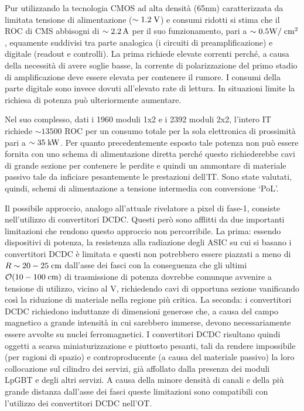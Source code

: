 
Pur utilizzando la tecnologia CMOS ad alta densit\`a (65nm) caratterizzata da limitata tensione di alimentazione ($\sim 1.2\rm \; V$) e consumi ridotti si stima che il ROC di CMS abbisogni di $\sim 2.2\rm \, A$ per il suo funzionamento, pari a $\sim 0.5{\mathrm W}/\rm \; cm^2$, equamente suddivisi tra parte analogica (i circuiti di preamplificazione) e digitale (readout e controlli). La prima richiede elevate correnti perch\'e, a causa della necessit\`a di avere soglie basse, la corrente di polarizzazione del primo stadio di amplificazione deve essere elevata per contenere il rumore. I consumi della parte digitale sono invece dovuti all'elevato rate di lettura. In situazioni limite la richiesa di potenza pu\`o ulteriormente aumentare.

Nel suo complesso, dati i 1960 moduli 1x2 e i 2392 moduli 2x2, l'intero IT richiede $\sim13500$ ROC per un consumo totale per la sola elettronica di prossimit\`a pari a $\sim 35\rm \; kW$. Per quanto precedentemente esposto tale potenza non pu\`o essere fornita con uno schema di alimentazione diretta perch\'e questo richiederebbe cavi di grande sezione per contenere le perdite e quindi un ammontare di materiale passivo tale da inficiare pesantemente le prestazioni dell'IT. Sono state valutati, quindi, schemi di alimentazione a tensione intermedia con conversione `PoL'.

Il possibile approccio, analogo all'attuale rivelatore a pixel di fase-1, consiste nell'utilizzo di convertitori DCDC. Questi per\`o sono afflitti da due importanti limitazioni che rendono questo approccio non percorribile. La prima: essendo dispositivi di potenza, la resistenza alla radiazione degli ASIC su cui si basano i convertitori DCDC \`e limitata e questi non potrebbero essere piazzati a meno di $R\sim20-25\rm \; cm$ dall'asse dei fasci con la conseguenza che gli ultimi ${\cal O}(10-100\rm \; cm)$ di trasmissione di potenza dovrebbe comunque avvenire a tensione di utilizzo, vicino al V, richiedendo cavi di opportuna sezione vanificando cos\`i la riduzione di materiale nella regione pi\`u critica. La seconda: i convertitori DCDC richiedono induttanze di dimensioni generose che, a causa del campo magnetico a grande intensit\`a in cui sarebbero immerse, devono necessariamente essere avvolte su nuclei ferromagnetici. I convertitori DCDC risultano quindi oggetti a scarsa miniaturizzazione e piuttosto pesanti, tali da rendere impossibile (per ragioni di spazio) e controproducente (a causa del materiale passivo) la loro collocazione sul cilindro dei servizi, gi\`a affollato dalla presenza dei moduli LpGBT e degli altri servizi. A causa della minore densit\`a di canali e della pi\`u grande distanza dall'asse dei fasci queste limitazioni sono compatibili con l'utilizzo dei convertitori DCDC nell'OT.

